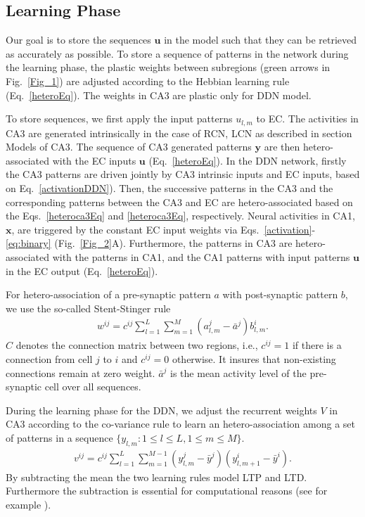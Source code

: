 \documentclass[utf8]{frontiersSCNS} %
\begin{document}
\subsection{Learning Phase}
\label{learning}
Our goal is to store the sequences $\mathbf u$ in the model such that they can be retrieved as accurately as possible. To store a sequence of patterns in the network during the learning phase, the plastic weights between subregions (green arrows in Fig.~\ref{Fig_1}) are adjusted according to the Hebbian learning rule (Eq.~\ref{heteroEq}). 
%
The weights in CA3 are plastic only for DDN model.

To store sequences, we first apply the input patterns $u_{l,m}$ to EC. The activities in CA3 are generated intrinsically in the case of RCN, LCN as described in section Models of CA3. The sequence of CA3 generated patterns $\mathbf y$ are then hetero-associated with the EC inputs $\mathbf u$ (Eq.~\ref{heteroEq}). 
%
In the DDN network, firstly the CA3 patterns are driven jointly by CA3 intrinsic inputs and EC inputs, based on Eq.~\ref{activationDDN}). Then, the successive patterns in the CA3 and the corresponding patterns between the CA3 and EC are hetero-associated based on the Eqs.~\ref{heteroca3Eq} and \ref{heteroca3Eq}, respectively.
%
Neural activities in CA1, $\mathbf x$, are triggered by the constant EC input weights via Eqs.~\ref{activation}-\ref{eq:binary} (Fig.~\ref{Fig_2}A). Furthermore, the patterns in CA3 are hetero-associated with the patterns in CA1, and the CA1 patterns with input patterns $\mathbf u$ in the EC output (Eq.~\ref{heteroEq}). 

For hetero-association of a pre-synaptic pattern $a$ with post-synaptic pattern $b$, we use the so-called Stent-Stinger rule \cite{stent1973physiological}
%
\begin{align}
	\label{heteroEq}
	w^{ij} = c^{ij}\sum_{l=1}^L{\sum_{m=1}^M(a^j_{l, m}  - \bar {a}^j)b_{l, m}^i}.
\end{align}
$C$ denotes the connection matrix between two regions, i.e., $c^{ij} = 1$ if there is a connection from cell $j$ to $i$ and $c^{ij} = 0$ otherwise. It insures that non-existing connections remain at zero weight. $\bar{a}^j$ is the mean activity level of the pre-synaptic cell over all sequences. 

During the learning phase for the DDN, we adjust the recurrent weights $V$ in CA3 according to the co-variance rule \cite{sejnowski1977storing} to learn an hetero-association among a set of patterns in a sequence $\{ y_{l, m}: 1\le l \le L, 1\le m \le M\}$.
\begin{align}
	\label{heteroca3Eq}
	v^{ij} =  c^{ij}\sum_{l=1}^L{\sum_{m=1}^{M-1}(y^j_{l, m}  - \bar {y}^j)(y_{l, m+1}^i - \bar{y}^i)}.
\end{align}
By subtracting the mean the two learning rules model LTP and LTD. Furthermore the subtraction is essential for computational reasons (see for example \cite[chapter 8.2]{amit1992modeling}).
\end{document}
